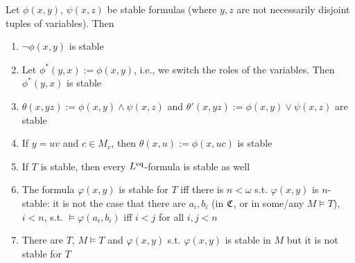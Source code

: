 \documentclass[11pt]{article}
\begin{document}
\begin{lemma}[]
Let \(\phi(x,y)\), \(\psi(x,z)\) be stable formulas (where \(y,z\) are not necessarily disjoint tuples
of variables). Then
\begin{enumerate}
\item \(\neg\phi(x,y)\) is stable
\item Let \(\phi^*(y,x):=\phi(x,y)\), i.e., we switch the roles of the variables. Then \(\phi^*(y,x)\) is
stable
\item \(\theta(x,yz):=\phi(x,y)\wedge\psi(x,z)\) and \(\theta'(x,yz):=\phi(x,y)\vee\psi(x,z)\) are stable
\item If \(y=uv\) and \(c\in M_v\), then \(\theta(x,u):=\phi(x,uc)\) is stable
\item If \(T\) is stable, then every \(L^{\operatorname{eq}}\)-formula is stable as well
\item The formula \(\varphi(x,y)\) is stable for \(T\) iff there is \(n<\omega\) s.t. \(\varphi(x,y)\)
is \(n\)-stable: it is not the case that there are \(a_i,b_i\) (in \(\mathfrak{C}\), or in
some/any \(M\vDash T\)), \(i< n\), s.t. \(\vDash\varphi(a_i,b_i)\) iff \(i< j\) for all \(i,j< n\)
\item There are \(T\), \(M\vDash T\) and \(\varphi(x,y)\) s.t. \(\varphi(x,y)\) is stable in \(M\) but it is not
stable for \(T\)
\end{enumerate}
\end{lemma}
\end{document}
